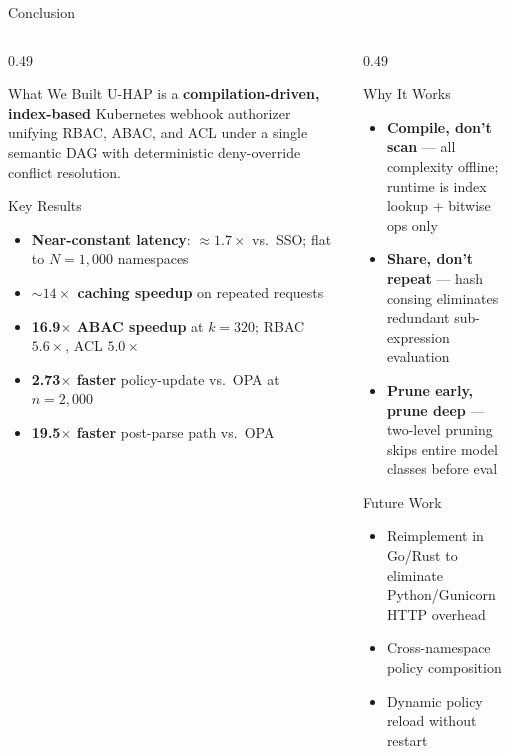 \documentclass[aspectratio=169,10pt]{beamer}
\newcommand{\tightitems}{%
  \setlength{\topsep}{1pt}%
  \setlength{\itemsep}{2pt}%
  \setlength{\parsep}{0pt}%
  \setlength{\parskip}{0pt}%
}
\begin{document}
\begin{frame}[t]{Conclusion}
\vspace{3pt}
\begin{columns}[T,onlytextwidth]
\begin{column}{0.49\textwidth}
\begin{callout}[fonttitle=\bfseries\small,fontupper=\scriptsize]{What We Built}
U-HAP is a \textbf{compilation-driven, index-based} Kubernetes webhook
authorizer unifying RBAC, ABAC, and ACL under a single semantic DAG with
deterministic deny-override conflict resolution.
\end{callout}
\vspace{3pt}
\begin{callout}[fonttitle=\bfseries\scriptsize]{Key Results}
\begin{itemize}\tightitems
\item \textbf{Near-constant latency}: ${\approx}1.7\times$ vs.\ SSO; flat to $N{=}1{,}000$ namespaces
\item \textbf{${\sim}14\times$ caching speedup} on repeated requests
\item \textbf{16.9$\times$ ABAC speedup} at $k{=}320$; RBAC $5.6\times$, ACL $5.0\times$
\item \textbf{2.73$\times$ faster} policy-update vs.\ OPA at $n{=}2{,}000$
\item \textbf{19.5$\times$ faster} post-parse path vs.\ OPA
\end{itemize}
\end{callout}
\end{column}
\begin{column}{0.49\textwidth}
\begin{callout}[fonttitle=\bfseries\scriptsize]{Why It Works}
\begin{itemize}\tightitems
\item \textbf{Compile, don't scan} --- all complexity offline; runtime is index lookup + bitwise ops only
\item \textbf{Share, don't repeat} --- hash consing eliminates redundant sub-expression evaluation
\item \textbf{Prune early, prune deep} --- two-level pruning skips entire model classes before eval
\end{itemize}
\end{callout}
\vspace{3pt}
\begin{callout}[fonttitle=\bfseries\scriptsize]{Future Work}
\begin{itemize}\tightitems
\item Reimplement in Go/Rust to eliminate Python/Gunicorn HTTP overhead
\item Cross-namespace policy composition
\item Dynamic policy reload without restart
\end{itemize}
\end{callout}
\end{column}
\end{columns}
\end{frame}
\end{document}
